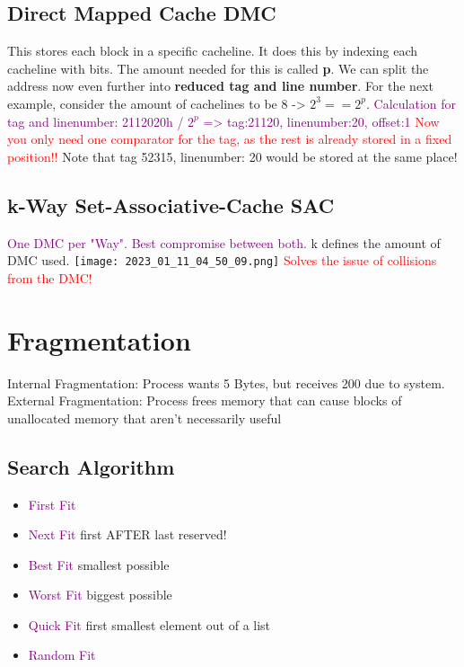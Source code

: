 \documentclass[main.tex,fontsize=8pt,paper=a4,paper=landscape,DIV=calc,]{scrartcl}
\begin{document}
\begin{multicols*}{4}
\subsection{Direct Mapped Cache DMC}
This stores each block in a specific cacheline. 
It does this by indexing each cacheline with bits. The amount needed for this is called \textbf{p}. 
We can split the address now even further into \textbf{reduced tag and line number}.
For the next example, consider the amount of cachelines to be 8 -> \(2^3 == 2^p\).
\textcolor{purple}{Calculation for tag and linenumber: 2112020h / \(2^p\) => tag:21120, linenumber:20, offset:1}
\textcolor{red}{Now you only need one comparator for the tag, as the rest is already stored in a fixed position!!}\newline
\textcolor{OliveGreen}{Note that tag 52315, linenumber: 20 would be stored at the same place!}

\subsection{k-Way Set-Associative-Cache SAC}
\textcolor{purple}{One DMC per "Way". Best compromise between both.}\newline
k defines the amount of DMC used.
\texttt{[image: 2023\_01\_11\_04\_50\_09.png]}
\textcolor{red}{Solves the issue of collisions from the DMC!}

\section{Fragmentation}
\textcolor{OliveGreen}{Internal Fragmentation:} Process wants 5 Bytes, but receives 200 due to system. \newline
\textcolor{OliveGreen}{External Fragmentation:} Process frees memory that can cause blocks of unallocated memory that aren't necessarily useful

\subsection{Search Algorithm}
\begin{itemize}
\item \textcolor{purple}{First Fit}
\item \textcolor{purple}{Next Fit} first AFTER last reserved!
\item \textcolor{purple}{Best Fit} smallest possible
\item \textcolor{purple}{Worst Fit} biggest possible
\item \textcolor{purple}{Quick Fit} \newline
  first smallest element out of a list
\item \textcolor{purple}{Random Fit}
\end{itemize} 


\end{multicols*}
\end{document}
